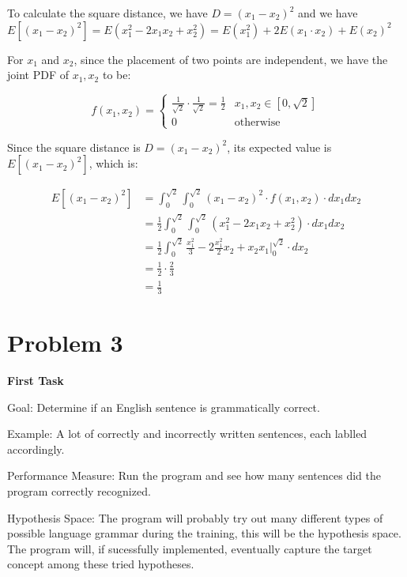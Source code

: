 \documentclass[12pt]{article}
\begin{document}
To calculate the square distance, we have $D = (x_1 - x_2) ^ 2$ and we have $E[(x_1 - x_2)^2] = E(x^2_1 - 2x_1x_2 +  x^2_2) =  E(x_1^2) + 2E(x_1\cdot x_2) + E(x_2)^2$

For $x_1$ and $x_2$, since the placement of two points are independent, we have the joint PDF of $x_1, x_2$ to be:

\[ f(x_1,x_2) = \begin{cases}
      \frac{1}{\sqrt{2}} \cdot \frac{1}{\sqrt{2}} = \frac{1}{2} & x_1, x_2 \in [0, \sqrt{2}]\\
      0 & \text{otherwise}
   \end{cases}
\]

Since the square distance is $D = (x_1 - x_2) ^ 2$, its expected value is $E[(x_1 - x_2)^2]$, which is:

\begin{align*}
    E[(x_1 - x_2)^2] &=   \int^{\sqrt{2}}_{0} \int^{\sqrt{2}}_{0} (x_1 - x_2)^2 \cdot f(x_1, x_2) \cdot dx_1 dx_2 \\
    &= \frac{1}{2} \int^{\sqrt{2}}_{0} \int^{\sqrt{2}}_{0} (x_1^2 - 2 x_1 x_2 + x_2^2) \cdot dx_1 dx_2 \\
    &= \frac{1}{2} \int^{\sqrt{2}}_{0}  \frac{x_1^2}{3} - 2\frac{x_1^2}{2}x_2 + x_2 x_1 \Big|^{\sqrt{2}}_{0} \cdot dx_2\\
    &= \frac{1}{2} \cdot \frac{2}{3} \\
    &= \frac{1}{3}
\end{align*}

\section{Problem 3}

\textbf{First Task}

Goal: Determine if an English sentence is grammatically correct.

Example: A lot of correctly and incorrectly written sentences, each lablled accordingly.

Performance Measure: Run the program and see how many sentences did the program correctly recognized.

Hypothesis Space: The program will probably try out many different types of possible language grammar during the training, this will be the hypothesis space. The program will, if sucessfully implemented, eventually capture the target concept among these tried hypotheses.
\end{document}
